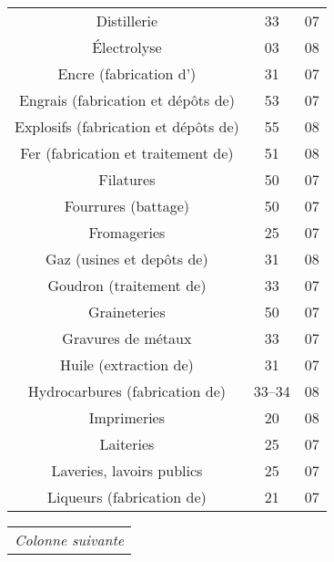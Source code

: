 \begin{minipage}[t]{0.49\linewidth}
\begin{tabularx}{\textwidth}[t]{c X c c}
\multicolumn{2}{p{4.8cm}}{Distillerie}									 												&	33				&	07 \\	
\multicolumn{2}{p{4.8cm}}{\'Electrolyse}									 											&	03				&	08 \\	
\multicolumn{2}{p{4.8cm}}{Encre (fabrication d')}									 								&	31				&	07 \\	
\multicolumn{2}{p{4.8cm}}{Engrais (fabrication et dépôts de)}				 								&	53				&	07 \\	
\multicolumn{2}{p{4.8cm}}{Explosifs (fabrication et dépôts de)}				 								&	55				&	08 \\	
\multicolumn{2}{p{4.8cm}}{Fer (fabrication et traitement de)}				 									&	51				&	08 \\	
\multicolumn{2}{p{4.8cm}}{Filatures}									 													&	50			&	07 \\	
\multicolumn{2}{p{4.8cm}}{Fourrures (battage)}									 									&	50			&	07 \\	
\multicolumn{2}{p{4.8cm}}{Fromageries}									 											&	25			&	07 \\	
\multicolumn{2}{p{4.8cm}}{Gaz (usines et depôts de)}									 						&	31			&	08 \\	
\multicolumn{2}{p{4.8cm}}{Goudron (traitement de)}									 							&	33			&	07 \\	
\multicolumn{2}{p{4.8cm}}{Graineteries}									 											&	50			&	07 \\	
\multicolumn{2}{p{4.8cm}}{Gravures de métaux}																	&	33			&	07 \\	
\multicolumn{2}{p{4.8cm}}{Huile (extraction de)}																	&	31			&	07 \\	
\multicolumn{2}{p{4.8cm}}{Hydrocarbures (fabrication de)}														&	33--34	&	08 \\	
\multicolumn{2}{p{4.8cm}}{Imprimeries}																				&	20			&	08 \\	
\multicolumn{2}{p{4.8cm}}{Laiteries}																						&	25			&	07 \\	
\multicolumn{2}{p{4.8cm}}{Laveries, lavoirs publics}																&	25			&	07 \\	
\multicolumn{2}{p{4.8cm}}{Liqueurs (fabrication de)}																&	21			&	07 \\	
\end{tabularx}
\end{minipage}
\begin{minipage}[b]{0.49\textwidth}
\begin{xltabular}{\textwidth}{R}
\midrule
\small\textit{Colonne suivante} \\
\end{xltabular}
\end{minipage}
